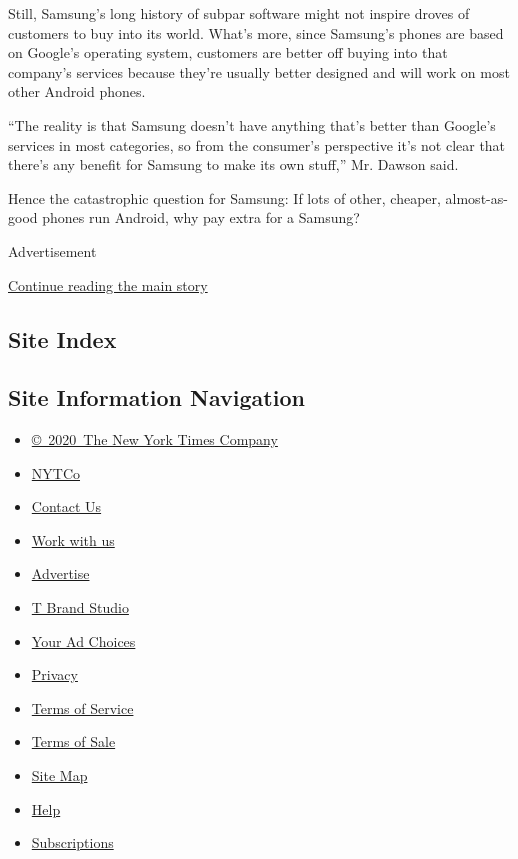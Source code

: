 Still, Samsung's long history of subpar software might not inspire
droves of customers to buy into its world. What's more, since Samsung's
phones are based on Google's operating system, customers are better off
buying into that company's services because they're usually better
designed and will work on most other Android phones.

``The reality is that Samsung doesn't have anything that's better than
Google's services in most categories, so from the consumer's perspective
it's not clear that there's any benefit for Samsung to make its own
stuff,'' Mr. Dawson said.

Hence the catastrophic question for Samsung: If lots of other, cheaper,
almost-as-good phones run Android, why pay extra for a Samsung?

Advertisement

\protect\hyperlink{after-bottom}{Continue reading the main story}

\hypertarget{site-index}{%
\subsection{Site Index}\label{site-index}}

\hypertarget{site-information-navigation}{%
\subsection{Site Information
Navigation}\label{site-information-navigation}}

\begin{itemize}
\tightlist
\item
  \href{https://help.nytimes.com/hc/en-us/articles/115014792127-Copyright-notice}{©~2020~The
  New York Times Company}
\end{itemize}

\begin{itemize}
\tightlist
\item
  \href{https://www.nytco.com/}{NYTCo}
\item
  \href{https://help.nytimes.com/hc/en-us/articles/115015385887-Contact-Us}{Contact
  Us}
\item
  \href{https://www.nytco.com/careers/}{Work with us}
\item
  \href{https://nytmediakit.com/}{Advertise}
\item
  \href{http://www.tbrandstudio.com/}{T Brand Studio}
\item
  \href{https://www.nytimes.com/privacy/cookie-policy\#how-do-i-manage-trackers}{Your
  Ad Choices}
\item
  \href{https://www.nytimes.com/privacy}{Privacy}
\item
  \href{https://help.nytimes.com/hc/en-us/articles/115014893428-Terms-of-service}{Terms
  of Service}
\item
  \href{https://help.nytimes.com/hc/en-us/articles/115014893968-Terms-of-sale}{Terms
  of Sale}
\item
  \href{https://spiderbites.nytimes.com}{Site Map}
\item
  \href{https://help.nytimes.com/hc/en-us}{Help}
\item
  \href{https://www.nytimes.com/subscription?campaignId=37WXW}{Subscriptions}
\end{itemize}
